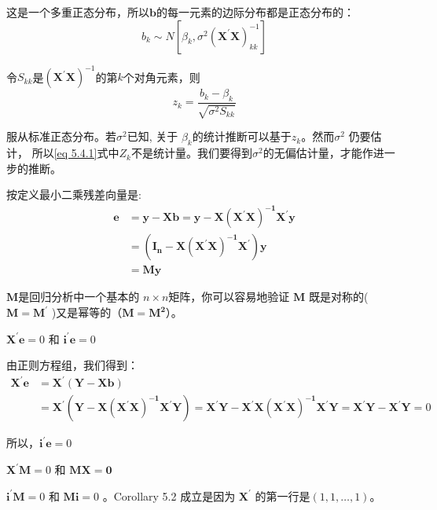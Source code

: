 这是一个多重正态分布，所以$ \boldsymbol{b} $的每一元素的边际分布都是正态分布的：
$$ b_{k} \sim N\left[\beta_{k}, \sigma^{2}\left(\boldsymbol{X^{\prime} X}\right)_{k k}^{-1}\right] $$

令$ S_{kk} $是$(\boldsymbol{X^{\prime}X} )^{−1} $的第$ k $个对角元素，则
\begin{equation}
    z_{k}=\frac{b_{k}-\beta_{k}}{\sqrt{\sigma^{2} S_{k k}}}
    \label{eq 5.4.1}
\end{equation}

服从标准正态分布。若$ \sigma^{2} $已知, 关于 $ \beta_{k} $的统计推断可以基于$ z_{k} $。然而$ \sigma^{2} $ 仍要估计，
所以\ref{eq 5.4.1}式中$ Z_k $不是统计量。我们要得到$ \sigma^{2} $的无偏估计量，才能作进一步的推断。

按定义最小二乘残差向量是:
$$ \begin{aligned}
    \boldsymbol{e} &= \boldsymbol{y-X b} = \boldsymbol{y-X\left(X^{\prime} X\right)^{-1} X^{\prime} y} \\
        &=\boldsymbol{\left(I_{n}-X\left(X^{\prime} X\right)^{-1} X^{\prime}\right) y} \\
        &=\boldsymbol{M y}
    \end{aligned} $$

   $ \boldsymbol{M} $是回归分析中一个基本的 $n \times n $矩阵，你可以容易地验证 $ \boldsymbol{M} $ 
   既是对称的($ \boldsymbol{M = M^{\prime}}$ )又是幂等的（$ \boldsymbol{M = M^{2}}$）。
\begin{mypty}
    $ \boldsymbol{X ^{\prime} e} = 0 $ 和 $ \boldsymbol{i ^{\prime} e} = 0 $ 
    \begin{myproof}
        由正则方程组，我们得到：
        $$ \begin{aligned}
            \boldsymbol{X^{\prime} e} & = \boldsymbol{X^{\prime}(Y-X b)} \\
            &=\boldsymbol{ X^{\prime}\left(Y-X\left(X^{\prime} X\right)^{-1} X^{\prime} Y\right)}
              = \boldsymbol{X^{\prime} Y-X^{\prime} X\left(X^{\prime} X\right)^{-1} X^{\prime} Y=X^{\prime} Y-X^{\prime} Y}=0
            \end{aligned} $$

        所以，$ \boldsymbol{ i ^{\prime} e } = 0 $
        \begin{mycor}
            $ \boldsymbol{X^{\prime} M}  = 0 $ 和 $ \boldsymbol{MX = 0}$
        \end{mycor}
        \begin{mycor}
            $ \boldsymbol{i^{\prime} M}  = 0 $ 和 $ \boldsymbol{Mi} = 0 $ 。Corollary 5.2 成立是因为 $ \boldsymbol{X^{\prime}} $ 的第一行是$(1,1,\ldots , 1)$。
        \end{mycor}
    \end{myproof}
\end{mypty}

